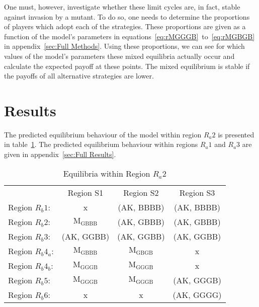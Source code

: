 \documentclass[a4paper,12pt]{article}
\numberwithin{equation}{section}
\begin{document}
One must, however, investigate whether these limit cycles are, in fact, stable against invasion by a mutant. To do so, one needs to determine the proportions of players which adopt each of the strategies. These proportions are given as a function of the model's parameters in equations~\ref{eq:rMGGGB}~to~\ref{eq:rMGBGB} in appendix~\ref{sec:Full Methods}. Using these proportions, we can see for which values of the model's parameters these mixed equilibria actually occur and calculate the expected payoff at these points. The mixed equilibrium is stable if the payoffs of all alternative strategies are lower.

\newpage


\section{Results}
\label{sec:Results}

The predicted equilibrium behaviour of the model within region $R_{a}2$ is presented in table~\ref{tab:CueGamewithObservableAmplification/EquilibriaRa2}. The predicted equilibrium behaviour within regions $R_{a}1$ and $R_{a}3$ are given in appendix~\ref{sec:Full Results}.

\begin{table}[h]
\begin{center}
\begin{tabular}{lccc}
 & Region S1 & Region S2 & Region S3\\
Region $R_{b}1$: & x & (AK, BBBB) & (AK, BBBB)\\
Region $R_{b}2$: & $\text{M}_{\text{GBBB}}$ & (AK, GBBB) & (AK, GBBB)\\
Region $R_{b}3$: & (AK, GGBB) & (AK, GGBB) & (AK, GGBB)\\
Region $R_{b}4_{a}$: & $\text{M}_{\text{GBBB}}$ & $\text{M}_{\text{GBGB}}$ & x\\
Region $R_{b}4_{b}$: & $\text{M}_{\text{GGGB}}$ & $\text{M}_{\text{GGGB}}$ & x\\
Region $R_{b}5$: & $\text{M}_{\text{GGGB}}$ & $\text{M}_{\text{GGGB}}$ & (AK, GGGB)\\
Region $R_{b}6$: & x& x & (AK, GGGG)
\end{tabular}
\end{center}
\caption{Equilibria within Region $R_{a}2$}
\label{tab:CueGamewithObservableAmplification/EquilibriaRa2}
\end{table}
\end{document}
